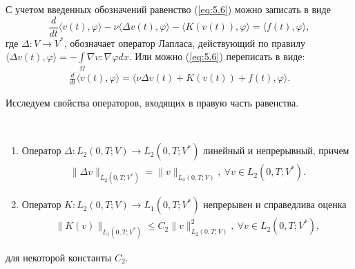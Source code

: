 С учетом введенных обозначений равенство (\ref{eq:5.6}) можно записать в виде
$$\frac{d}{dt} \langle v(t),\varphi \rangle - \nu\langle \Delta v(t), \varphi \rangle -
\langle K(v(t)),\varphi \rangle = \langle f(t),\varphi \rangle,$$
где $\Delta: V \rightarrow V^\ast$, обозначает оператор Лапласа, действующий по правилу
$\langle \Delta v(t),\varphi \rangle=-\int\limits_\Omega \nabla v:\nabla\varphi dx.$
Или можно (\ref{eq:5.6}) переписать в виде:
\begin{equation}\label{eq:5.8}
    \begin{gathered}
        \frac{d}{dt} \langle v(t),\varphi \rangle = \langle \nu\Delta v(t)+K(v(t))+f(t),\varphi \rangle.
    \end{gathered}
\end{equation}

Исследуем свойства операторов, входящих в правую часть равенства.
\begin{lemma} ~\\
    \begin{enumerate}
        \item Оператор $\Delta: L_2(0, T; V) \rightarrow L_2(0, T; V^\ast)$ линейный и\linebreak
        непрерывный, причем
        \begin{equation}\label{eq:5.9}
            \begin{gathered}
                \| \Delta v \|_{L_2(0, T; V^\ast)} = \| v \|_{L_2(0, T; V)}, \ \forall v \in L_2(0, T; V^\ast).
            \end{gathered}
        \end{equation}
        \item Оператор $K: L_2(0, T; V) \rightarrow L_1(0, T; V^\ast)$ непрерывен и справедлива оценка
        \begin{equation}\label{eq:5.10}
            \begin{gathered}
                \| K(v) \|_{L_1(0, T; V^\ast)} \leqslant C_2\| v \|^2_{L_2(0, T;V)}, \ \forall v \in L_2(0, T; V^\ast),
            \end{gathered}
        \end{equation}
    \end{enumerate}
    для некоторой константы $C_2$.
\end{lemma}


